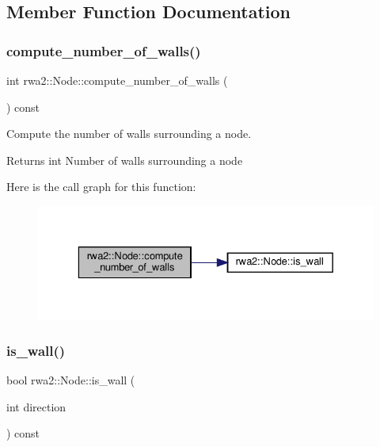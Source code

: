 \subsection{Member Function Documentation}
\mbox{\label{classrwa2_1_1_node_a6057b0b97f6b815a57aad534cd021674}} 
\subsubsection{\texorpdfstring{compute\+\_\+number\+\_\+of\+\_\+walls()}{compute\_number\_of\_walls()}}
{\footnotesize\ttfamily int rwa2\+::\+Node\+::compute\+\_\+number\+\_\+of\+\_\+walls (\begin{DoxyParamCaption}{ }\end{DoxyParamCaption}) const}



Compute the number of walls surrounding a node. 

\begin{DoxyReturn}{Returns}
int Number of walls surrounding a node 
\end{DoxyReturn}
Here is the call graph for this function\+:
\nopagebreak
\begin{figure}[H]
\begin{center}
\leavevmode
\includegraphics[width=329pt]{classrwa2_1_1_node_a6057b0b97f6b815a57aad534cd021674_cgraph}
\end{center}
\end{figure}
\mbox{\label{classrwa2_1_1_node_acd6ab64157b7b60bea708ddb52ddb1a8}} 
\subsubsection{\texorpdfstring{is\+\_\+wall()}{is\_wall()}}
{\footnotesize\ttfamily bool rwa2\+::\+Node\+::is\+\_\+wall (\begin{DoxyParamCaption}\item[{int}]{direction }\end{DoxyParamCaption}) const}



